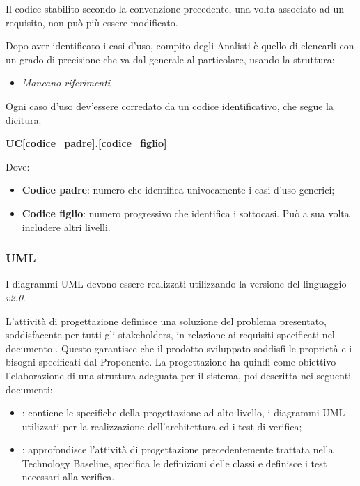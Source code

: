                     \noindent Il codice stabilito secondo la convenzione precedente, una volta associato ad un requisito, non può più essere modificato.
                    
                                Dopo aver identificato i casi d'uso, compito degli Analisti è quello di elencarli con un grado di precisione che va dal generale al particolare, usando la struttura:
                \begin{itemize}
                \item{\textit{Mancano riferimenti}}
                \end{itemize}

                \noindent Ogni caso d'uso dev'essere corredato da un codice identificativo, che segue la dicitura: 
                \begin{center}
                \textbf{UC[codice\_padre].[codice\_figlio]}
                \end{center}
                
                \noindent Dove:
                \begin{itemize}
                 	\item{\textbf{Codice padre}: numero che identifica univocamente i casi d'uso generici;}
			\item{\textbf{Codice figlio}: numero progressivo che identifica i sottocasi. Può a sua volta includere altri livelli.}
                \end{itemize}
                                
                \subsubsection*{UML}
                I diagrammi UML devono essere realizzati utilizzando la versione del linguaggio \textit{v2.0}.
                
            L'attività di progettazione definisce una soluzione del problema presentato, soddisfacente per tutti gli stakeholders, in relazione ai requisiti specificati nel documento \AdR{}. Questo garantisce che il prodotto sviluppato soddisfi le proprietà e i bisogni specificati dal Proponente. 
            La progettazione ha quindi come obiettivo l'elaborazione di una struttura adeguata per il sistema, poi descritta nei seguenti documenti:
            \begin{itemize}
            	\item{\textbf{\TB}: contiene le specifiche della progettazione ad alto livello, i diagrammi UML utilizzati per la realizzazione dell'architettura ed i test di verifica;}
		\item{\textbf{\PB}: approfondisce l'attività di progettazione precedentemente trattata nella Technology Baseline, specifica le definizioni delle classi e definisce i test necessari alla verifica.}
	     \end{itemize}
	     
